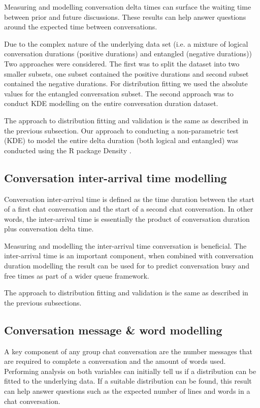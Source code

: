 \documentclass[conference]{IEEEtran}
\begin{document}
Measuring and modelling conversation delta times can surface the waiting time between prior and future discussions. These results can help answer questions around the expected time between conversations. 

Due to the complex nature of the underlying data set (i.e. a mixture of logical conversation durations (positive durations) and entangled (negative durations)) Two approaches were considered. The first was to split the dataset into two smaller subsets, one subset contained the positive durations and second subset contained the negative durations. For distribution fitting we used the absolute values for the entangled conversation subset. The second approach was to conduct KDE modelling on the entire conversation duration dataset. 

The approach to distribution fitting and validation is the same as described in the previous subsection. Our approach to conducting a non-parametric test (KDE) to model the entire delta duration (both logical and entangled) was conducted using the R package Density \cite{Rdensity}. 

\subsection{Conversation inter-arrival time modelling}

Conversation inter-arrival time is defined as the time duration between the start of a first chat conversation and the start of a second chat conversation. In other words, the inter-arrival time is essentially the product of conversation duration plus conversation delta time.  

Measuring and modelling the inter-arrival time conversation is beneficial.  The inter-arrival time is an important component, when combined with conversation duration modelling the result can be used for to predict conversation busy and free times as part of a wider queue framework.

The approach to distribution fitting and validation is the same as described in the previous subsections. 

\subsection{Conversation message \& word modelling}

A key component of any group chat conversation are the number messages that are required to complete a conversation and the amount of words used. Performing analysis on both variables can initially tell us if a distribution can be fitted to the underlying data. If a suitable distribution can be found, this result can help answer questions such as the expected number of lines and words in a chat conversation.
\end{document}
